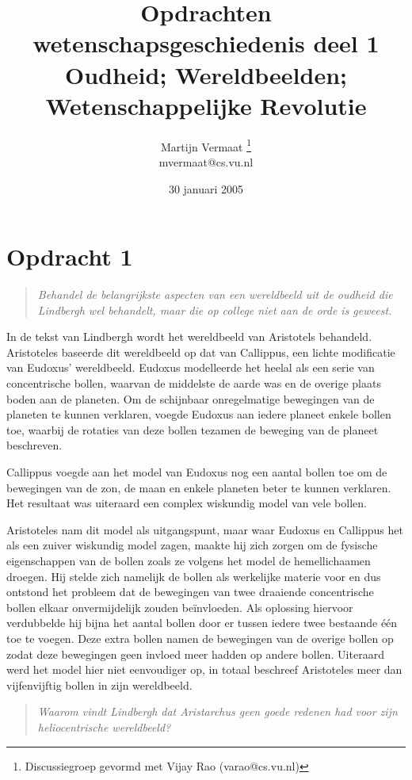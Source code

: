\documentclass[a4paper,11pt]{article}
\title{Opdrachten wetenschapsgeschiedenis deel 1\\
Oudheid; Wereldbeelden; Wetenschappelijke Revolutie}
\author{
    Martijn Vermaat
    \footnote{Discussiegroep gevormd met Vijay Rao (varao@cs.vu.nl)}\\
    mvermaat@cs.vu.nl
}
\date{30 januari 2005}
\begin{document}
\maketitle


\section*{Opdracht 1}


\begin{quote}
\emph{Behandel de belangrijkste aspecten van een wereldbeeld uit de oudheid
  die Lindbergh wel behandelt, maar die op college niet aan de orde is
  geweest.}
\end{quote}


In de tekst van Lindbergh wordt het wereldbeeld van Aristotels
behandeld. Aristoteles baseerde dit wereldbeeld op dat van Callippus, een
lichte modificatie van Eudoxus' wereldbeeld. Eudoxus modelleerde het heelal
als een serie van concentrische bollen, waarvan de middelste de aarde was en
de overige plaats boden aan de planeten. Om de schijnbaar onregelmatige
bewegingen van de planeten te kunnen verklaren, voegde Eudoxus aan iedere
planeet enkele bollen toe, waarbij de rotaties van deze bollen tezamen de
beweging van de planeet beschreven.

Callippus voegde aan het model van Eudoxus nog een aantal bollen toe om de
bewegingen van de zon, de maan en enkele planeten beter te kunnen
verklaren. Het resultaat was uiteraard een complex wiskundig model van vele
bollen.

Aristoteles nam dit model als uitgangspunt, maar waar Eudoxus en Callippus
het als een zuiver wiskundig model zagen, maakte hij zich zorgen om de
fysische eigenschappen van de bollen zoals ze volgens het model de
hemellichaamen droegen. Hij stelde zich namelijk de bollen als werkelijke
materie voor en dus ontstond het probleem dat de bewegingen van twee draaiende
concentrische bollen elkaar onvermijdelijk zouden be\"invloeden. Als oplossing
hiervoor verdubbelde hij bijna het aantal bollen door er tussen iedere twee
bestaande \'e\'en toe te voegen. Deze extra bollen namen de bewegingen van de
overige bollen op zodat deze bewegingen geen invloed meer hadden op andere
bollen. Uiteraard werd het model hier niet eenvoudiger op, in totaal beschreef
Aristoteles meer dan vijfenvijftig bollen in zijn wereldbeeld.


\begin{quote}
\emph{Waarom vindt Lindbergh dat Aristarchus geen goede redenen had voor zijn
  heliocentrische wereldbeeld?}
\end{quote}
\end{document}
